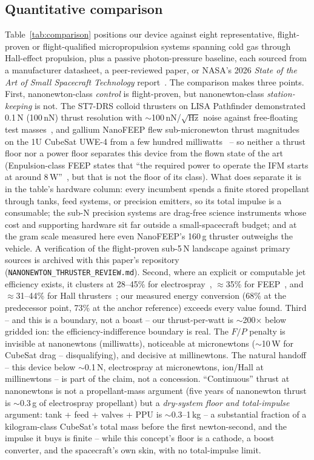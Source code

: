 \documentclass[11pt]{article}
\begin{document}
\subsection{Quantitative comparison}
\label{sec:comparison-table}
Table~\ref{tab:comparison} positions our device against eight representative,
flight-proven or flight-qualified micropropulsion systems spanning cold gas
through Hall-effect propulsion, plus a passive photon-pressure baseline, each
sourced from a manufacturer datasheet, a peer-reviewed paper, or NASA's 2026
\emph{State of the Art of Small Spacecraft Technology} report~\cite{nasasoa26}.
The comparison makes three points. First, nanonewton-class \emph{control} is
flight-proven, but nanonewton-class \emph{station-keeping} is not. The
ST7-DRS colloid thrusters on LISA Pathfinder demonstrated 0.1\,\textmu N
(100\,nN) thrust resolution with $\sim$100\,nN/$\sqrt{\mathrm{Hz}}$ noise
against free-floating test masses~\cite{anderson18}, and gallium NanoFEEP
flew sub-micronewton thrust magnitudes on the 1U CubeSat UWE-4 from a few
hundred milliwatts~\cite{bock18} -- so neither a thrust floor nor a power
floor separates this device from the flown state of the art (Enpulsion-class
FEEP states that ``the required power to operate the IFM starts at around
8\,W''~\cite{enpifm}, but that is not the floor of its class). What does
separate it is in the table's hardware column: every incumbent spends a
finite stored propellant through tanks, feed systems, or precision emitters,
so its total impulse is a consumable; the sub-\textmu N precision systems
are drag-free science instruments whose cost and supporting hardware sit
far outside a small-spacecraft budget; and at the gram scale measured here
even NanoFEEP's 160\,g thruster outweighs the vehicle. A verification of
the flight-proven sub-5\,\textmu N landscape against primary sources is
archived with this paper's repository
(\texttt{NANONEWTON\_THRUSTER\_REVIEW.md}). Second, where an explicit or computable jet
efficiency exists, it clusters at 28--45\% for
electrospray~\cite{busekbetmax21}, $\approx$35\% for FEEP~\cite{krejci19},
and $\approx$31--44\% for Hall thrusters~\cite{busekbht200}; our measured
energy conversion (68\% at the predecessor point, 73\% at the anchor
reference) exceeds every value found. Third -- and this is a boundary, not
a boast -- our thrust-per-watt is $\sim$200$\times$ below gridded ion: the
efficiency-indifference boundary is real. The $F/P$ penalty is invisible at
nanonewtons (milliwatts), noticeable at micronewtons ($\sim$10\,W for
CubeSat drag -- disqualifying), and decisive at millinewtons. The natural
handoff -- this device below $\sim$0.1\,\textmu N, electrospray at
micronewtons, ion/Hall at millinewtons -- is part of the claim, not a
concession. ``Continuous'' thrust at
nanonewtons is not a propellant-mass argument (five years of nanonewton
thrust is $\sim$0.3\,g of electrospray propellant) but a \emph{dry-system
floor and total-impulse} argument: tank + feed + valves + PPU is
$\sim$0.3--1\,kg -- a substantial fraction of a kilogram-class CubeSat's
total mass before the first newton-second, and the impulse it buys is
finite -- while this concept's floor is a cathode, a boost converter, and
the spacecraft's own skin, with no total-impulse limit.
\end{document}
